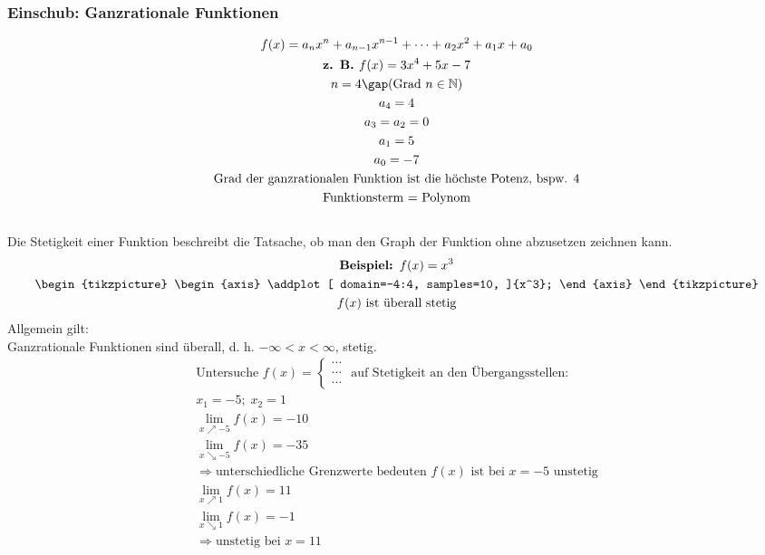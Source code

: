 \subsubsection{Einschub: Ganzrationale Funktionen}
\begin{gather*}
  f(x) = a_nx^n + a_{n-1}x^{n-1} + \dots + a_2x^2 + a_1x + a_0 \\
  \textbf{z. B. } f(x) = 3x^4 + 5x - 7 \\
  n = 4 \gap\text{(Grad } n \in \mathbb{N}\text{)} \\ a_4 = 4 \\ a_3 = a_2 = 0 \\ a_1 = 5 \\ a_0 = -7 \\
  \text{Grad der ganzrationalen Funktion ist die höchste Potenz, bspw. 4} \\
  \text{Funktionsterm = Polynom}
\end{gather*} \\
Die Stetigkeit einer Funktion beschreibt die Tatsache, ob man den Graph der Funktion ohne abzusetzen zeichnen kann.
\begin{gather*}
  \textbf{Beispiel: } f(x) = x^3 \\
  \begin{tikzpicture}
    \begin{axis}
      \addplot[
      domain=-4:4,
      samples=10,
      ]{x^3};
    \end{axis}
  \end{tikzpicture} \\
  f(x) \text{ ist überall stetig}
\end{gather*}
Allgemein gilt: \\ Ganzrationale Funktionen sind überall, d. h. $-\infty < x < \infty$, stetig. \\
\begin{gather*}
\text{Untersuche $f(x) = \begin{cases} \cdots \\ \cdots \\ \cdots \end{cases}$ auf Stetigkeit an den Übergangsstellen:} \\
  x_1 = -5;\; x_2 = 1 \\
  \lim\limits_{x \nearrow -5} f(x) = -10 \\
  \lim\limits_{x \searrow -5} f(x) = -35 \\
  \Rightarrow \text{unterschiedliche Grenzwerte bedeuten $f(x)$ ist bei $x = -5$ unstetig} \\
  \lim\limits_{x \nearrow 1} f(x) = 11 \\
  \lim\limits_{x \searrow 1} f(x) = -1 \\
  \Rightarrow \text{unstetig bei $x = 11$}
\end{gather*}
